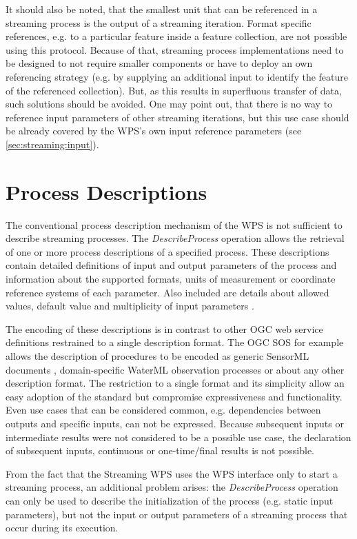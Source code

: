   It should also be noted, that the smallest unit that can be referenced in a streaming process is the output of a streaming iteration. Format specific references, e.g. to a particular feature inside a feature collection, are not possible using this protocol. Because of that, streaming process implementations need to be designed to not require smaller components or have to deploy an own referencing strategy (e.g. by supplying an additional input to identify the feature of the referenced collection). But, as this results in superfluous transfer of data, such solutions should be avoided. One may point out, that there is no way to reference input parameters of other streaming iterations, but this use case should be already covered by the \ac{WPS}'s own input reference parameters (see \cref{sec:streaming:input}).

\section{Process Descriptions}
  \label{sec:stream:processdescription}
  The conventional process description mechanism of the \ac{WPS} is not sufficient to describe streaming processes. The \emph{DescribeProcess} operation allows the retrieval of one or more process descriptions of a specified process. These descriptions contain detailed definitions of input and output parameters of the process and information about the supported formats, units of measurement or coordinate reference systems of each parameter. Also included are details about allowed values, default value and multiplicity of input parameters \citep{ogc:wps}.

  The encoding of these descriptions is in contrast to other OGC web service definitions restrained to a single description format. The OGC \acl{SOS} for example allows the description of procedures to be encoded as generic SensorML documents \citep{ogc:sensorml1,ogc:sensorml2}, domain-specific WaterML observation processes \citep{ogc:waterml} or about any other description format. The restriction to a single format and its simplicity allow an easy adoption of the standard but compromise expressiveness and functionality. Even use cases that can be considered common, e.g. dependencies between outputs and specific inputs, can not be expressed. Because subsequent inputs or intermediate results were not considered to be a possible use case, the declaration of subsequent inputs, continuous or one-time/final results is not possible.

  From the fact that the Streaming WPS uses the \ac{WPS} interface only to start a streaming process, an additional problem arises: the \emph{DescribeProcess} operation can only be used to describe the initialization of the process (e.g. static input parameters), but not the input or output parameters of a streaming process that occur during its execution.

